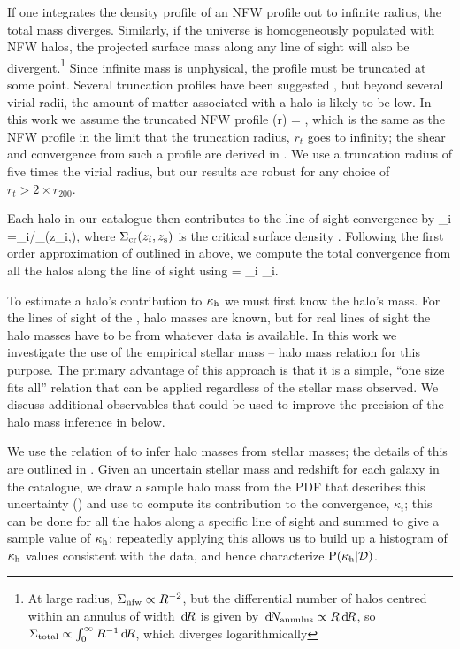 \documentclass[useAMS,usenatbib,a4paper]{mn2e}
\begin{document}
If one integrates the density profile of an NFW profile out to infinite
radius, the total mass diverges. Similarly, if the universe is
homogeneously populated with NFW halos, the projected surface mass along
any line of sight will also be divergent.\footnote{At large radius,
$\Sigma_{\rm nfw} \propto R^{-2}$, but the differential number of halos
centred within an annulus of width $\, \mathrm{d} \! R$ is given by $\, \mathrm{d} \! N_{\rm
annulus} \propto R \, \mathrm{d} \! R$, so  $\Sigma_{\rm total} \propto
\int_{0}^{\infty} R^{-1} \, \mathrm{d} \! R$, which diverges logarithmically} Since
infinite mass is unphysical, the profile must be truncated at some
point. Several truncation profiles have been suggested
\citep[e.g][]{BMO}, but beyond several virial radii, the amount of
matter associated with a halo is likely to be low. In this work we
assume the truncated NFW profile
\be\label{eq:bmoprofile}
\rho(r) = 
,
\ee
which is the same as the NFW profile in the limit that the truncation
radius, $r_t$ goes to infinity; the shear and convergence from such a
profile are derived in \citet{BMO}.
 We use a truncation radius of five times
the virial radius, but our results are robust for any choice of $r_t>2
\times r_{200}$. 

Each halo in our catalogue then contributes to
the line of sight convergence by
\be
\label{eq:kappai}
\kappa_i =\Sigma_{i}/\Sigma_{}(z_i,\zs),
\ee
where $\Sigma_{\mathrm{cr}}(z_i,z_{\rm s})$ is the critical surface density .
Following the first order approximation of \citet{HilbertEtal2009}
outlined in  above, we compute 
the total convergence from all the halos along the line
of sight using
\be 
\label{eq:kappasummu}
\kappah = \sum_{i} \kappa_i.
\ee

To estimate a halo's contribution to $\kappa_{\rm h}$ we must first know the
halo's mass. For the lines of sight of the \MS, halo masses are
known, but for  real lines of sight the halo masses have to be \infered
from whatever data is available. 
In this work we investigate the use of the empirical stellar mass --
halo mass relation for this purpose. The primary advantage of this
approach is that it is a simple, ``one size fits all'' relation that can
be applied regardless of the stellar mass observed. We discuss
additional observables that could be used to improve the precision of
the halo mass inference in  below. 

We use the relation of \citet{BehrooziEtal2010} to infer halo masses
from stellar masses; the details of this \proceedure are outlined in 
. Given an uncertain stellar mass and redshift for
each galaxy in the  catalogue, we draw a sample halo mass from the PDF
that describes this uncertainty  ()  and use
 to compute its contribution to the convergence,
$\kappa_i$; this can be done for all the halos along a specific line of sight
and summed to give a sample value of $\kappa_{\rm h}$;  repeatedly applying
this \proceedure allows us to build up a histogram of $\kappa_{\rm h}$ values
consistent with the data, and hence characterize ${\rm P}(\kappa_{\rm h}|{\mathcal{D}})$. 
\end{document}
